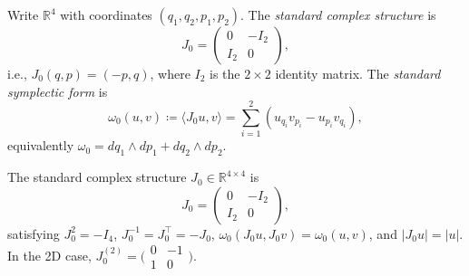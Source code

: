 %
%



\begin{definition}\label{def:symplectic-form}
Write $\mathbb{R}^4$ with coordinates $(q_1, q_2, p_1, p_2)$.
The \emph{standard complex structure} is
\[
  J_0 = \begin{pmatrix} 0 & -I_2 \\ I_2 & 0 \end{pmatrix},
\]
i.e., $J_0(q, p) = (-p, q)$,
where $I_2$ is the $2 \times 2$ identity matrix.
The \emph{standard symplectic form} is
\[
  \omega_0(u, v) \coloneqq \langle J_0 u, v \rangle
  = \sum_{i=1}^{2} (u_{q_i} v_{p_i} - u_{p_i} v_{q_i}),
\]
equivalently $\omega_0 = dq_1 \wedge dp_1 + dq_2 \wedge dp_2$.
\end{definition}


\begin{unverified}
\begin{definition}\label{def:J0}
The standard complex structure $J_0 \in \mathbb{R}^{4 \times 4}$ is
\[
  J_0 = \begin{pmatrix} 0 & -I_2 \\ I_2 & 0 \end{pmatrix},
\]
satisfying $J_0^2 = -I_4$, $J_0^{-1} = J_0^\top = -J_0$,
$\omega_0(J_0 u, J_0 v) = \omega_0(u,v)$, and $|J_0 u| = |u|$.
In the 2D case, $J_0^{(2)} = \bigl(\begin{smallmatrix} 0 & -1 \\ 1 & 0 \end{smallmatrix}\bigr)$.
\end{definition}
\end{unverified}


